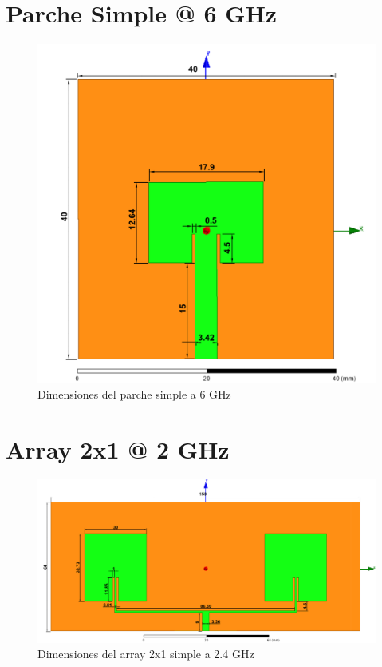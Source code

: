 \section{Parche Simple @ 6 GHz}
\vfill
\begin{figure}[H]
   	 \centering
        \includegraphics[width=\textwidth, height=\textheight, keepaspectratio=true]{archivos/desarrollo/autocad/2}
        \caption{Dimensiones del parche simple a 6 GHz}
        \label{fig:simple2}
\end{figure}
\vfill
\newpage

\section{Array 2x1 @ 2 GHz}
\vfill
\begin{figure}[H]
   	 \centering
        \includegraphics[width=\textwidth ,height=\textheight, keepaspectratio=true,angle=90,origin=c]{archivos/desarrollo/autocad/3}
        \caption{Dimensiones del array 2x1 simple a 2.4 GHz}
        \label{fig:2x11}
\end{figure}
\vfill
\newpage

